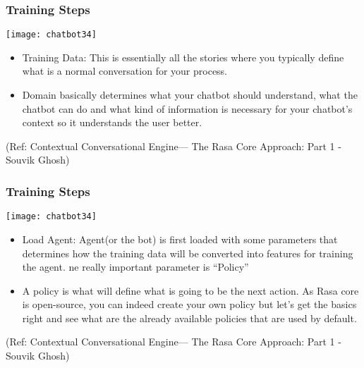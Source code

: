  \begin{frame}[fragile]\frametitle{Training Steps}
 

\begin{center}
\texttt{[image: chatbot34]}

\end{center}

\begin{itemize}
\item Training Data: This is essentially all the stories where you typically define what is a normal conversation for your process.
\item Domain basically determines what your chatbot should understand, what the chatbot can do and what kind of information is necessary for your chatbot’s context so it understands the user better. 
\end{itemize}


\tiny{(Ref: Contextual Conversational Engine— The Rasa Core Approach: Part 1 - Souvik Ghosh)}

\end{frame}

 \begin{frame}[fragile]\frametitle{Training Steps}
 

\begin{center}
\texttt{[image: chatbot34]}

\end{center}

\begin{itemize}
\item Load Agent: Agent(or the bot) is first loaded with some parameters that determines how the training data will be converted into features for training the agent. ne really important parameter is ``Policy''
\item A policy is what will define what is going to be the next action. As Rasa core is open-source, you can indeed create your own policy but let’s get the basics right and see what are the already available policies that are used by default.
\end{itemize}


\tiny{(Ref: Contextual Conversational Engine— The Rasa Core Approach: Part 1 - Souvik Ghosh)}

\end{frame}

